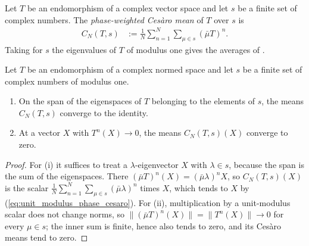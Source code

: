 \begin{definition}
    \label{def:weighted_cesaro_mean}
    \leanok
    Let $T$ be an endomorphism of a complex vector space and let $s$ be a
    finite set of complex numbers. The \emph{phase-weighted Ces\`aro mean} of
    $T$ over $s$ is
    \begin{align}
        C_{N}(T,s)
         & :=\frac{1}{N}\sum_{n=1}^{N}\sum_{\mu\in s}(\bar\mu T)^{n}.
        \label{eq:weighted_cesaro_mean}
    \end{align}
    Taking for $s$ the eigenvalues of $T$ of modulus one gives the averages of
    \cite[Equation~(6.15)]{Wolf2012Quantum}.
\end{definition}

\begin{lemma}
    \label{lem:weighted_cesaro_mean_on_splitting}
    \leanok
    Let $T$ be an endomorphism of a complex normed space and let $s$ be a
    finite set of complex numbers of modulus one.
    \begin{enumerate}
        \item[(i)] On the span of the eigenspaces of $T$ belonging to the
              elements of $s$, the means $C_{N}(T,s)$ converge to the
              identity.
        \item[(ii)] At a vector $X$ with $T^{n}(X)\to0$, the means
              $C_{N}(T,s)(X)$ converge to zero.
    \end{enumerate}
\end{lemma}

\begin{proof}\leanok
    For (i) it suffices to treat a $\lambda$-eigenvector $X$ with
    $\lambda\in s$, because the span is the sum of the eigenspaces. There
    $(\bar\mu T)^{n}(X)=(\bar\mu\lambda)^{n}X$, so
    $C_{N}(T,s)(X)$ is the scalar
    $\frac{1}{N}\sum_{n=1}^{N}\sum_{\mu\in s}(\bar\mu\lambda)^{n}$ times $X$,
    which tends to $X$ by (\ref{eq:unit_modulus_phase_cesaro}).
    For (ii), multiplication by a unit-modulus scalar does not change norms,
    so $\lVert(\bar\mu T)^{n}(X)\rVert=\lVert T^{n}(X)\rVert\to0$ for every
    $\mu\in s$; the inner sum is finite, hence also tends to zero, and its
    Ces\`aro means tend to zero.
\end{proof}

